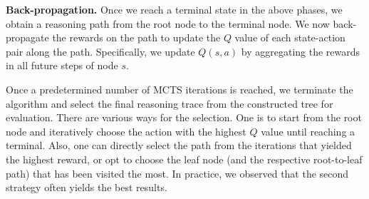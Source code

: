 
\noindent \textbf{Back-propagation.}
Once we reach a terminal state in the above phases, we obtain a reasoning path from the root node to the terminal node. We now back-propagate the rewards on the path to update the $Q$ value of each state-action pair along the path. Specifically, we update $Q(s, a)$ by aggregating the rewards in all future steps of node $s$.

Once a predetermined number of MCTS iterations is reached, we terminate the algorithm and select the final reasoning trace from the constructed tree for evaluation. There are various ways for the selection.
One is to start from the root node and iteratively choose the action with the highest $Q$ value until reaching a terminal.
Also, one can directly select the path from the iterations that yielded the highest reward, or opt to choose the leaf node (and the respective root-to-leaf path) that has been visited the most.
In practice, we observed that the second strategy often yields the best results.


